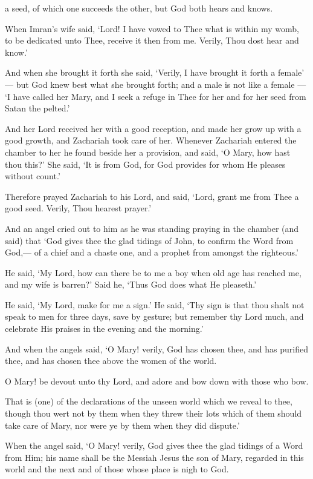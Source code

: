 \documentclass[fontsize=14pt, letterpaper, notitlepage, openany, DIV=12]{scrbook} %
\begin{document}
\noindent[3:34]
a seed, of which one succeeds the other, but God both hears and knows.

\noindent[3:35]
When Imran's wife said, `Lord! I have vowed to Thee what is within my womb, to be
dedicated unto Thee, receive it then from me. Verily, Thou dost hear and know.'

\noindent[3:36]
And when she brought it forth she said, `Verily, I have brought it forth a female' --- but
God knew best what she brought forth; and a male is not like a female --- `I have called her
Mary, and I seek a refuge in Thee for her and for her seed from Satan the pelted.'

\noindent[3:37]
And her Lord received her with a good reception, and made her grow up with a good
growth, and Zachariah took care of her. Whenever Zachariah entered the chamber to her he
found beside her a provision, and said, `O Mary, how hast thou this?' She said, `It is from God,
for God provides for whom He pleases without count.'

\noindent[3:38]
Therefore prayed Zachariah to his Lord, and said, `Lord, grant me from Thee a good
seed. Verily, Thou hearest prayer.'

\noindent[3:39]
And an angel cried out to him as he was standing praying in the chamber (and said) that
`God gives thee the glad tidings of John, to confirm the Word from God,--- of a chief and a
chaste one, and a prophet from amongst the righteous.'

\noindent[3:40]
He said, `My Lord, how can there be to me a boy when old age has reached me, and my
wife is barren?' Said he, `Thus God does what He pleaseth.'

\noindent[3:41]
He said, `My Lord, make for me a sign.' He said, `Thy sign is that thou shalt not speak to
men for three days, save by gesture; but remember thy Lord much, and celebrate His praises in
the evening and the morning.'

\noindent[3:42]
And when the angels said, `O Mary! verily, God has chosen thee, and has purified thee,
and has chosen thee above the women of the world.

\noindent[3:43]
O Mary! be devout unto thy Lord, and adore and bow down with those who bow.

\noindent[3:44]
That is (one) of the declarations of the unseen world which we reveal to thee, though thou
wert not by them when they threw their lots which of them should take care of Mary, nor were ye
by them when they did dispute.'

\noindent[3:45]
When the angel said, `O Mary! verily, God gives thee the glad tidings of a Word from
Him; his name shall be the Messiah Jesus the son of Mary, regarded in this world and the next
and of those whose place is nigh to God.
\end{document}
